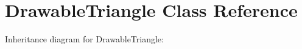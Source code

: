 \hypertarget{classDrawableTriangle}{}\section{Drawable\+Triangle Class Reference}
\label{classDrawableTriangle}


Inheritance diagram for Drawable\+Triangle\+:

